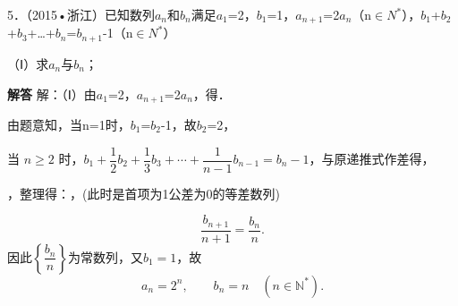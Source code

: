 5．（2015•浙江）已知数列{\ensuremath{a_{n}}}和{\ensuremath{b_{n}}}满足\ensuremath{a_{1}}=2，\ensuremath{b_{1}}=1，\ensuremath{a_{n+1}}=2\ensuremath{a_{n}}（n\ensuremath{\in}\ensuremath{N^{*}}），\ensuremath{b_{1}}+\ensuremath{b_{2}}+\ensuremath{b_{3}}+\ldots{}+\ensuremath{b_{n}}=\ensuremath{b_{n+1}}-1（n\ensuremath{\in}\ensuremath{N^{*}}）\par
（Ⅰ）求\ensuremath{a_{n}}与\ensuremath{b_{n}}；\par
\QuestionSpace{3.5cm}
\ifshowanswers
\par\begingroup\color{solutioncolor}\noindent\textbf{解答}\quad
解：（Ⅰ）由\ensuremath{a_{1}}=2，\ensuremath{a_{n+1}}=2\ensuremath{a_{n}}，得．\par
由题意知，当n=1时，\ensuremath{b_{1}}=\ensuremath{b_{2}}-1，故\ensuremath{b_{2}}=2，\par
当 $n\geq2$ 时，$b_1+\dfrac12b_2+\dfrac13b_3+\cdots+\dfrac1{n-1}b_{n-1}=b_n-1$，与原递推式作差得，\par
{}，整理得：，(此时是首项为1公差为0的等差数列)\par
\[
\frac{b_{n+1}}{n+1}=\frac{b_n}{n}.
\]
因此$\left\{\dfrac{b_n}{n}\right\}$为常数列，又$b_1=1$，故
\[
\boxed{a_n=2^n,\qquad b_n=n}\quad(n\in\mathbb N^*).
\]
\par\endgroup\fi

